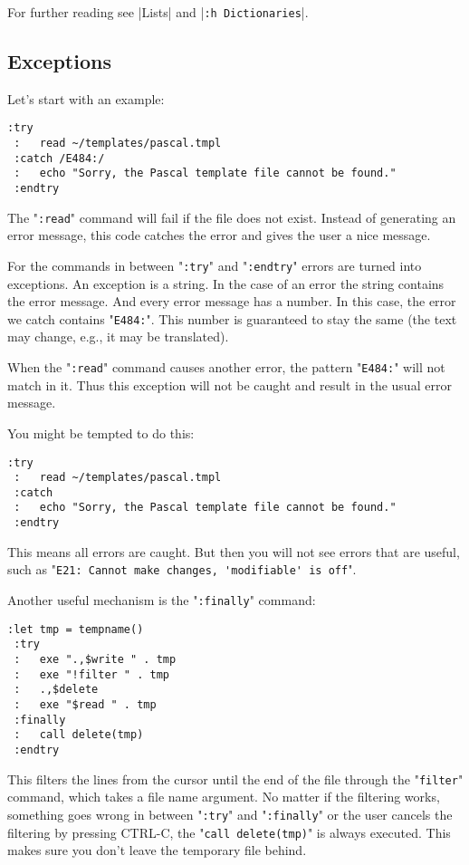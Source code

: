 For further reading see |Lists| and |\verb!:h Dictionaries!|.
\subsection{Exceptions}
Let's start with an example:

\begin{Verbatim}[samepage=true]
 :try
 :   read ~/templates/pascal.tmpl
 :catch /E484:/
 :   echo "Sorry, the Pascal template file cannot be found."
 :endtry
\end{Verbatim}

The "\verb!:read!" command will fail if the file does not exist.
Instead of generating an error message, this code catches the error and gives the user a nice message.

For the commands in between "\verb!:try!" and "\verb!:endtry!" errors are turned into exceptions.
An exception is a string.
In the case of an error the string contains the error message.
And every error message has a number.
In this case, the error we catch contains "\verb!E484:!".
This number is guaranteed to stay the same (the text may change, e.g., it may be translated).

When the "\verb!:read!" command causes another error, the pattern "\verb!E484:!" will not match in it.
Thus this exception will not be caught and result in the usual error message.

You might be tempted to do this:

\begin{Verbatim}[samepage=true]
 :try
 :   read ~/templates/pascal.tmpl
 :catch
 :   echo "Sorry, the Pascal template file cannot be found."
 :endtry
\end{Verbatim}

This means all errors are caught.
But then you will not see errors that are useful, such as "\verb!E21: Cannot make changes, 'modifiable' is off!".

Another useful mechanism is the "\verb!:finally!" command:

\begin{Verbatim}[samepage=true]
 :let tmp = tempname()
 :try
 :   exe ".,$write " . tmp
 :   exe "!filter " . tmp
 :   .,$delete
 :   exe "$read " . tmp
 :finally
 :   call delete(tmp)
 :endtry
\end{Verbatim}

This filters the lines from the cursor until the end of the file through the "\verb!filter!" command, which takes a file name argument.
No matter if the filtering works, something goes wrong in between "\verb!:try!" and "\verb!:finally!" or the user cancels the filtering by pressing CTRL-C, the "\verb!call delete(tmp)!" is always executed.
This makes sure you don't leave the temporary file behind.

